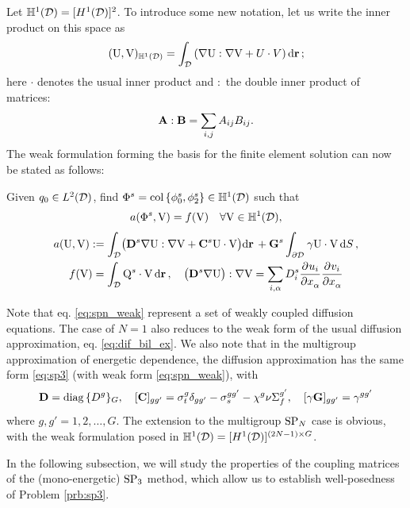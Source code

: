 Let $\mathbb{H}^1(\VV) =
[H^1(\VV)]^2$. To introduce some new notation, let us write the inner product on this space as
\begin{equation}\label{eq:ipHH1}
	(\mathrm{U}, \mathrm{V})_{\mathbb{H}^1(\VV)} = \int_{\VV}\left(\nabla\mathrm{U} : \nabla\mathrm{V} + U\cdot
	V\right)\d{\br};
\end{equation}
here $\cdot$ denotes the usual inner product and $:$ the double inner product of matrices:
$$
	\mat{A} : \mat{B} = \sum_{i,j}A_{ij}B_{ij}.
$$
The weak formulation forming the basis for the finite
element solution can now be stated as follows:
\begin{problem}\label{prb:sp3}
Given $q_0 \in \Lp[2](\VV)$, find $\Phi^s = \col \{\phi^s_0, \phi^s_2\} \in \mathbb{H}^1(\VV)$ such that
\begin{equation}\label{eq:spn_weak}
\begin{gathered}
	a(\Phi^s, \mathrm{V}) = f(\mathrm{V}) \quad \forall \mathrm{V}\in \mathbb{H}^1(\VV),\\[.3em]
	a(\mathrm{U}, \mathrm{V}) := \int_{\VV} \bigl(\mat{D}^s\nabla\mathrm{U} : \nabla \mathrm{V} +
	\mat{C}^s \mathrm{U}\cdot\mathrm{V}\bigr)\d{\br} + \mat{G}^s \int_{\pV} \gamma\mathrm{U}\cdot\mathrm{V}
	\,\d{S},\\
 	f(\mathrm{V}) = \int_{\VV}\mathrm{Q}^s\cdot\mathrm{V}\,\d{\br},\quad \bigl(\mat{D}^s\nabla\mathrm{U}\bigr) : \nabla
 	\mathrm{V} = \sum_{i,\alpha}D^s_i\pd{u_i}{x_\alpha}\pd{v_i}{x_\alpha}
\end{gathered} 
\end{equation}
\end{problem}

Note that eq. \eqref{eq:spn_weak} represent a set of weakly coupled diffusion equations. The case of $N=1$ also reduces
to the weak form of the usual diffusion approximation, eq. \eqref{eq:dif_bil_ex}. We also note that in the multigroup
approximation of energetic dependence, the diffusion approximation has the same form \eqref{eq:sp3} (with weak form
\eqref{eq:spn_weak}), with 
$$
	\mat{D} = \diag\{D^g\}_G,\quad
	[\mat{C}]_{gg'} = \sigma_t^g \delta_{gg'} - \sigma_{s}^{gg'} - \chi^g\nu\Sigma_f^{g'}, \quad
	[\gamma\mat{G}]_{gg'} = \gamma^{gg'} 
$$
where $g,g' = 1,2,\ldots,G$. The extension to the multigroup $\SPN$ case is obvious, with the weak formulation posed in 
$\mathbb{H}^1(\VV) = [H^1(\VV)]^{(2N-1)\times G}$.

In the following subsection, we will study the properties of the coupling matrices of the (mono-energetic) $\SPN[3]$
method, which allow us to establish well-posedness of Problem \ref{prb:sp3}.

